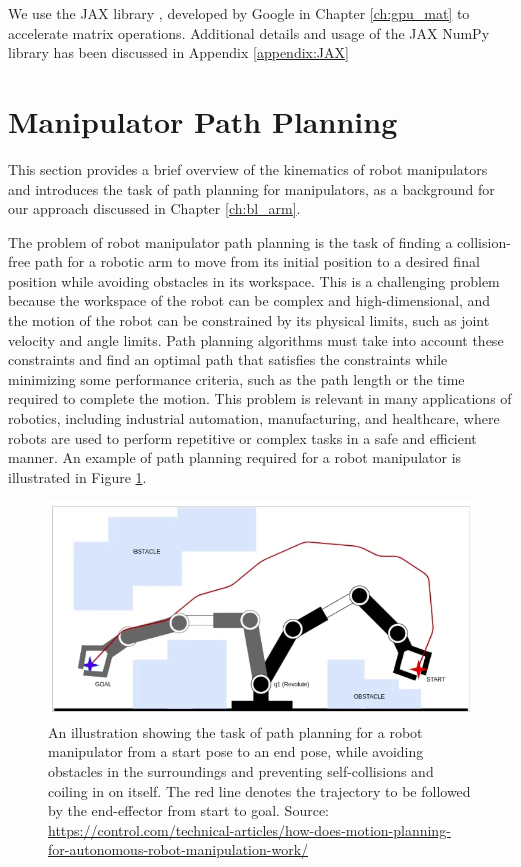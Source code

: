 We use the JAX library \cite{bradbury2020jax}, developed by Google in Chapter \ref{ch:gpu_mat} to accelerate matrix operations. Additional details and usage of the JAX NumPy library has been discussed in Appendix \ref{appendix:JAX}



\section{Manipulator Path Planning}

This section provides a brief overview of the kinematics of robot manipulators and introduces the task of path planning for manipulators, as a background for our approach discussed in Chapter \ref{ch:bl_arm}.

The problem of robot manipulator path planning is the task of finding a collision-free path for a robotic arm to move from its initial position to a desired final position while avoiding obstacles in its workspace. This is a challenging problem because the workspace of the robot can be complex and high-dimensional, and the motion of the robot can be constrained by its physical limits, such as joint velocity and angle limits. Path planning algorithms must take into account these constraints and find an optimal path that satisfies the constraints while minimizing some performance criteria, such as the path length or the time required to complete the motion. This problem is relevant in many applications of robotics, including industrial automation, manufacturing, and healthcare, where robots are used to perform repetitive or complex tasks in a safe and efficient manner. An example of path planning required for a robot manipulator is illustrated in Figure \ref{fig:manipulator-planning}.

\begin{figure}[ht]
    \centering
    \includegraphics[scale=0.5]{figures/background/manipulator_planning.png}
    \caption[Path Planning for a Manipulator]{An illustration showing the task of path planning for a robot manipulator from a start pose to an end pose, while avoiding obstacles in the surroundings and preventing self-collisions and coiling in on itself. The red line denotes the trajectory to be followed by the end-effector from start to goal. Source: \scriptsize{\url{https://control.com/technical-articles/how-does-motion-planning-for-autonomous-robot-manipulation-work/}}}
    \label{fig:manipulator-planning}
\end{figure}

